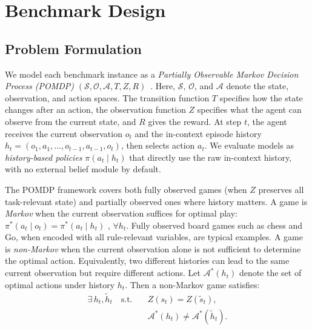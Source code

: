 \section{Benchmark Design}
\label{sec:benchmark_design}

\subsection{Problem Formulation}
\label{sec:problem_formulation}

We model each benchmark instance as a \emph{Partially Observable Markov Decision Process (POMDP)} $(\mathcal{S}, \mathcal{O}, \mathcal{A}, T, Z, R)$~\citep{kaelbling1998planning}. Here, $\mathcal{S}$, $\mathcal{O}$, and $\mathcal{A}$ denote the state, observation, and action spaces. The transition function $T$ specifies how the state changes after an action, the observation function $Z$ specifies what the agent can observe from the current state, and $R$ gives the reward. At step $t$, the agent receives the current observation $o_t$ and the in-context episode history $h_t=(o_1,a_1,\ldots,o_{t-1},a_{t-1},o_t)$, then selects action $a_t$. We evaluate models as \emph{history-based policies} $\pi(a_t \mid h_t)$ that directly use the raw in-context history, with no external belief module by default.

The POMDP framework covers both fully observed games (when $Z$ preserves all task-relevant state) and partially observed ones where history matters. A game is \emph{Markov} when the current observation suffices for optimal play: $\pi^*(a_t\mid o_t)=\pi^*(a_t\mid h_t)$ , $\forall h_t$. Fully observed board games such as chess and Go, when encoded with all rule-relevant variables, are typical examples. A game is \emph{non-Markov} when the current observation alone  is not sufficient to determine the optimal action. Equivalently, two different histories can lead to the same current observation but require different actions. Let $\mathcal{A}^*(h_t)$ denote the set of optimal actions under history $h_t$. Then a non-Markov game satisfies:
\vspace{-5pt}
\begin{equation}
\label{eq:non_markov}
\begin{split}
\exists\, h_t, \tilde{h}_t \quad \text{s.t.} \quad
& Z(s_t) = Z(\tilde{s}_t), \\
& \mathcal{A}^*(h_t) \neq \mathcal{A}^*(\tilde{h}_t).
\end{split}
\end{equation}
\vspace{-1em}

